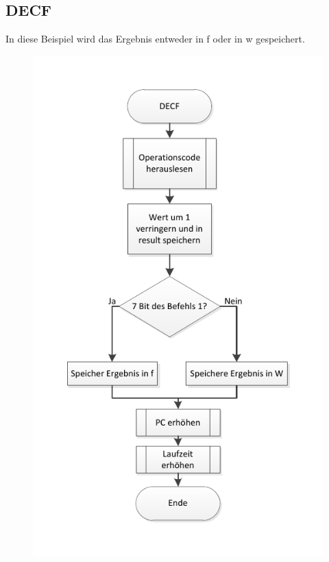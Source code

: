 \subsection{DECF}
In diese Beispiel wird das Ergebnis entweder in f oder in w gespeichert.

\begin{figure}[h]
\centering
\includegraphics[scale=0.6]{Diag/DECF.pdf}
\end{figure}

